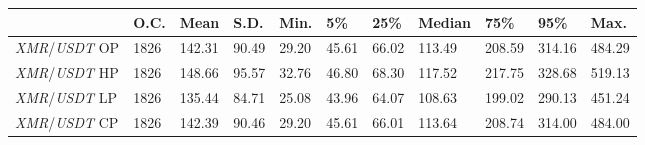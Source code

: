 \begin{tabular}{lllllllllll}
\toprule
 & \textbf{O.C.} & \textbf{Mean} & \textbf{S.D.} & \textbf{Min.} & \textbf{5\%} & \textbf{25\%} & \textbf{Median} & \textbf{75\%} & \textbf{95\%} & \textbf{Max.} \\
\midrule
\emph{XMR}/\emph{USDT} OP & 1826 & 142.31 & 90.49 & 29.20 & 45.61 & 66.02 & 113.49 & 208.59 & 314.16 & 484.29 \\
\emph{XMR}/\emph{USDT} HP & 1826 & 148.66 & 95.57 & 32.76 & 46.80 & 68.30 & 117.52 & 217.75 & 328.68 & 519.13 \\
\emph{XMR}/\emph{USDT} LP & 1826 & 135.44 & 84.71 & 25.08 & 43.96 & 64.07 & 108.63 & 199.02 & 290.13 & 451.24 \\
\emph{XMR}/\emph{USDT} CP & 1826 & 142.39 & 90.46 & 29.20 & 45.61 & 66.01 & 113.64 & 208.74 & 314.00 & 484.00 \\
\bottomrule
\end{tabular}
